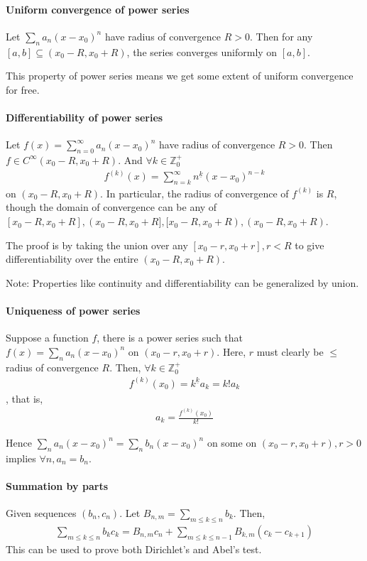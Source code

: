 \documentclass{article}
\begin{document}
\paragraph{Uniform convergence of power series} Let $\sum_n a_n(x-x_0)^n$ have radius of convergence $R>0$. Then for any $[a,b]\subseteq (x_0-R, x_0+R)$, the series converges uniformly on $[a,b]$.

This property of power series means we get some extent of uniform convergence for free.

\paragraph{Differentiability of power series} Let $f(x)=\sum_{n=0}^\infty a_n(x-x_0)^n$ have radius of convergence $R>0$. Then $f\in C^{\infty}(x_0-R, x_0+R)$. And $\forall k\in \mathbb{Z}^+_0$
\begin{align*}
	f^{(k)}(x) = \sum_{n=k}^\infty n^{\underline{k}}(x-x_0)^{n-k}
\end{align*}
on $(x_0-R, x_0+R)$. In particular, the radius of convergence of $f^{(k)}$ is $R$, though the domain of convergence can be any of $[x_0-R, x_0+R], (x_0-R, x_0+R], [x_0-R, x_0+R), (x_0-R, x_0+R)$.

The proof is by taking the union over any $[x_0 - r, x_0 + r], r<R$ to give differentiability over the entire $(x_0-R, x_0+R)$.

Note: Properties like continuity and differentiability can be generalized by union.

\paragraph{Uniqueness of power series} Suppose a function $f$, there is a power series such that $f(x) = \sum_n a_n(x-x_0)^n$ on $(x_0-r, x_0+r)$. Here, $r$ must clearly be $\leq$ radius of convergence $R$. Then, $\forall k\in \mathbb{Z}^+_0$
\begin{align*}
	f^{(k)}(x_0) = k^{\underline{k}}a_k = k!a_k
\end{align*},
that is, \begin{align*}
	a_k = \frac{f^{(k)}(x_0)}{k!}
\end{align*}

Hence $\sum_n a_n(x-x_0)^n = \sum_n b_n(x-x_0)^n$ on some on $(x_0-r, x_0+r), r>0$ implies $\forall n, a_n = b_n$.

\paragraph{Summation by parts} Given sequences $(b_n, c_n)$. Let $B_{n,m}=\sum_{m\leq k\leq n}b_k$. Then,
\begin{align*}
	\sum_{m\leq k\leq n} b_kc_k = B_{n,m}c_n + \sum_{m\leq k\leq n-1}B_{k,m}(c_k - c_{k+1})
\end{align*}
This can be used to prove both Dirichlet's and Abel's test.
\end{document}
